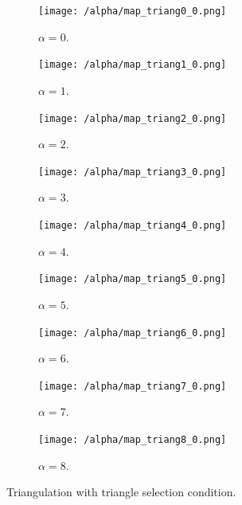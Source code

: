 \begin{figure}[h]
    \centering
    \begin{subfigure}[b]{0.3\textwidth}
        \centering
        \texttt{[image: /alpha/map\_triang0\_0.png]}
        \caption{$\alpha=0$.}
        \label{fig:alpha0}
    \end{subfigure}
    \begin{subfigure}[b]{0.3\textwidth}
        \centering
        \texttt{[image: /alpha/map\_triang1\_0.png]}
        \caption{$\alpha=1$.}
        \label{fig:alpha1}
    \end{subfigure}
    \begin{subfigure}[b]{0.3\textwidth}
        \centering
        \texttt{[image: /alpha/map\_triang2\_0.png]}
        \caption{$\alpha=2$.}
        \label{fig:alpha2}
    \end{subfigure}
    \begin{subfigure}[b]{0.3\textwidth}
        \centering
        \texttt{[image: /alpha/map\_triang3\_0.png]}
        \caption{$\alpha=3$.}
        \label{fig:alpha3}
    \end{subfigure}
    \begin{subfigure}[b]{0.3\textwidth}
        \centering
        \texttt{[image: /alpha/map\_triang4\_0.png]}
        \caption{$\alpha=4$.}
        \label{fig:alpha4}
    \end{subfigure}
    \begin{subfigure}[b]{0.3\textwidth}
        \centering
        \texttt{[image: /alpha/map\_triang5\_0.png]}
        \caption{$\alpha=5$.}
        \label{fig:alpha5}
    \end{subfigure}
    \begin{subfigure}[b]{0.3\textwidth}
        \centering
        \texttt{[image: /alpha/map\_triang6\_0.png]}
        \caption{$\alpha=6$.}
        \label{fig:alpha6}
    \end{subfigure}
    \begin{subfigure}[b]{0.3\textwidth}
        \centering
        \texttt{[image: /alpha/map\_triang7\_0.png]}
        \caption{$\alpha=7$.}
        \label{fig:alpha7}
    \end{subfigure}
    \begin{subfigure}[b]{0.3\textwidth}
        \centering
        \texttt{[image: /alpha/map\_triang8\_0.png]}
        \caption{$\alpha=8$.}
        \label{fig:alpha8}
    \end{subfigure}
    \caption{Triangulation with triangle selection condition.} \label{fig:C7_alpha}
\end{figure}

